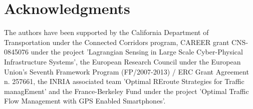 \section{Acknowledgments}\label{sec:ack}

The authors have been supported by the California Department of Transportation
under the Connected Corridors program, CAREER grant CNS-0845076 under the
project 'Lagrangian Sensing in Large Scale Cyber-Physical Infrastructure
Systems', the European Research Council under the European Union's Seventh Framework Program (FP/2007-2013) / ERC Grant Agreement n. 257661, the INRIA associated team 'Optimal REroute Strategies for Traffic managEment' and the France-Berkeley Fund under the project 'Optimal Traffic Flow Management with GPS Enabled Smartphones'.